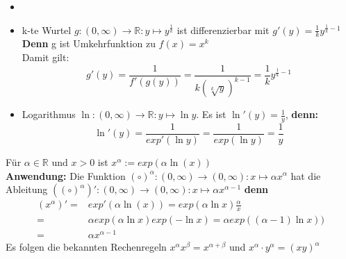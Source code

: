 \begin{Beispiel}{
	\begin{itemize}
		\item[]
		\item k-te Wurtel $g: (0,\infty) \rightarrow \mathbb{R} : 
		y \mapsto y^{\frac{1}{k}}$ ist differenzierbar mit 
		$g'(y) = \frac{1}{k}y^{\frac{1}{k}-1}$
		\textbf{Denn} g ist Umkehrfunktion zu $f(x) = x^k$ \\
		Damit gilt: 
		\begin{equation*}g'(y) = \frac{1}{f'(g(y))} = \frac{1}{k(\sqrt[k]{y})^{k-1}}
		= \frac{1}{k}y^{\frac{1}{k} -1}
		\end{equation*}
		\item Logarithmus $\ln: (0,\infty) \rightarrow \mathbb{R}: 
		y \mapsto \ln y$. Es ist 
		$\ln'(y) = \frac{1}{y}$, \textbf{denn:}
		\begin{equation*}\ln'(y) = \frac{1}{exp'(\ln y)}
		= \frac{1}{exp(\ln y)} = \frac{1}{y}
		\end{equation*}
	\end{itemize}
}\end{Beispiel}

\begin{Bemerkung}{
	Für $\alpha \in \mathbb{R}$ und $x > 0$ ist $x^\alpha := exp(\alpha \ln(x))$ \\
	\textbf{Anwendung:} Die Funktion $\left( \circ \right)^\alpha : 
	(0, \infty) \rightarrow (0, \infty): x \mapsto \alpha x^{\alpha}$ hat die Ableitung 
	$((\circ)^{\alpha})' : (0, \infty) \rightarrow (0, \infty) : 
	x \mapsto \alpha x^{\alpha-1}$
	\textbf{denn} 
	\begin{align*}
	(x^{\alpha})' = & exp'(\alpha \ln(x)) = exp(\alpha\ln x) \frac{\alpha}{x} \\
	= & \alpha exp(\alpha \ln x) exp (-\ln x) =  \alpha exp ((\alpha -1 ) \ln x)) \\
	= & \alpha x^{\alpha-1}
	\end{align*}
	Es folgen die bekannten Rechenregeln $x^{\alpha}x^{\beta} = x^{\alpha+\beta} $
	und $x^\alpha \cdot y^\alpha = (xy)^\alpha$
}\end{Bemerkung}

